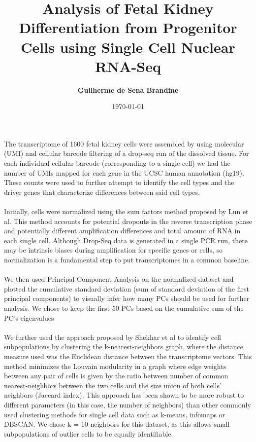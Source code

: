 \documentclass[11pt]{article}
\title{\bf Analysis of Fetal Kidney Differentiation from Progenitor Cells using Single Cell Nuclear RNA-Seq}
\author{\bf Guilherme de Sena Brandine}
\date{\today}
\begin{document}
\maketitle

The transcriptome of 1600 fetal kidney cells were assembled by using molecular (UMI) and cellular barcode filtering of a drop-seq run of the dissolved tissue. For each individual cellular barcode (corresponding to a single cell) we had the number of UMIs mapped for each gene in the UCSC human annotation (hg19). These counts were used to further attempt to identify the cell types and the driver genes that characterize differences between said cell types. \\
\\
Initially, cells were normalized using the sum factors method proposed by Lun et al. This method accounts for potential dropouts in the reverse transcription phase and potentially different amplification differences and total amount of RNA in each single cell. Although Drop-Seq data is generated in a single PCR run, there may be intrinsic biases during amplification for specific genes or cells, so normalization is a fundamental step to put transcriptomes in a common baseline.\\
\\
We then used Principal Component Analysis on the normalized dataset and plotted the cumulative standard deviation (sum of standard deviation of the first principal components) to visually infer how many PCs should be used for further analysis. We chose to keep the first 50 PCs based on the cumulative sum of the PC's eigenvalues\\
\\
We further used the approach proposed by Shekhar et al to identify cell subpopulations by clustering the k-nearest-neighbors graph, where the distance measure used was the Euclidean distance between the transcriptome vectors. This method minimizes the Louvain modularity in a graph where edge weights between any pair of cells is given by the ratio between number of common nearest-neighbors between the two cells and the size union of both cells' neighbors (Jaccard index). This approach has been shown to be more robust to different parameters (in this case, the number of neighbors) than other commonly used clustering methods for single cell data such as k-means, infomaps or DBSCAN. We chose k = 10 neighbors for this dataset, as this allows small subpopulations of outlier cells to be equally identifiable. \\
\\
\end{document}
